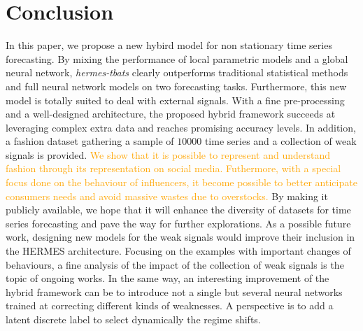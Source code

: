 \documentclass[10pt]{article} %
\newcommand{\numberts}{10000}
\begin{document}
\section{Conclusion}
\label{sec:conclusion}
In this paper, we propose  a new hybird model for non stationary time series forecasting. By mixing the performance of local parametric models and a global neural network, \textit{hermes-tbats} clearly outperforms traditional statistical methods and full neural network models on two forecasting tasks. Furthermore, this new model is totally suited to deal with external signals. With a fine pre-processing and a well-designed architecture, the proposed hybrid framework succeeds at leveraging complex extra data and reaches promising accuracy levels. In addition, a fashion dataset gathering a sample of $\numberts$ time series and a collection of weak signals is provided. \textcolor{orange}{We show that it is possible to represent and understand fashion through its representation on social media. Futhermore, with a special focus done on the behaviour of influencers, it become possible to better anticipate consumers needs and avoid massive wastes due to overstocks.} By making it publicly available, we hope that it will enhance the diversity of datasets for time series forecasting and pave the way for further explorations.
As a possible future work, designing new models for the weak signals would improve their inclusion  in the HERMES architecture. Focusing on the examples with important changes of behaviours, a fine analysis of the impact of the collection of weak signals is the topic of ongoing works. In the same way, an interesting improvement of the hybrid framework can be to introduce not a single but several neural networks trained at correcting different kinds of weaknesses. A perspective is to add a latent discrete label to select dynamically the regime shifts. 




\appendix
\end{document}
